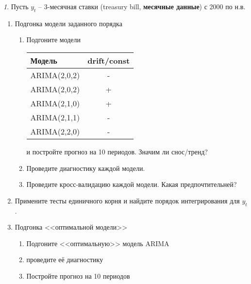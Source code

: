 \documentclass[12pt]{article}
\theoremstyle{remark}
\newtheorem{exercise}{}[subsection]
\begin{document}
\begin{exercise}
Пусть \(y_t\) -- 3-месячная ставки (treasury bill, \textbf{месячные данные}) с 2000 по н.в.
\begin{enumerate}
	\item Подгонка модели заданного порядка
	\begin{enumerate}
		\item Подгоните модели
		\begin{center}
		\begin{tabular}{l|c}
			Модель & drift/const \\ \hline
			ARIMA(2,0,2) & - \\
			ARIMA(2,0,2) & + \\
			ARIMA(2,1,0) & + \\
			ARIMA(2,1,1) & - \\
			ARIMA(2,2,0) & - \\ \hline
		\end{tabular}
		\end{center} 
		и постройте прогноз на 10 периодов. Значим ли снос/тренд?
		\item Проведите диагностику каждой модели.
		\item Проведите кросс-валидацию каждой модели. Какая предпочтительней?
	\end{enumerate}
	\item Примените тесты единичного корня и найдите порядок интегрирования для \(y_t\). 
	\item Подгонка <<оптимальной модели>>
	\begin{enumerate}
		\item Подгоните <<оптимальную>> модель ARIMA
		\item проведите её диагностику
		\item Постройте прогноз на 10 периодов
	\end{enumerate}
\end{enumerate}
\end{exercise}
	
\end{document}
